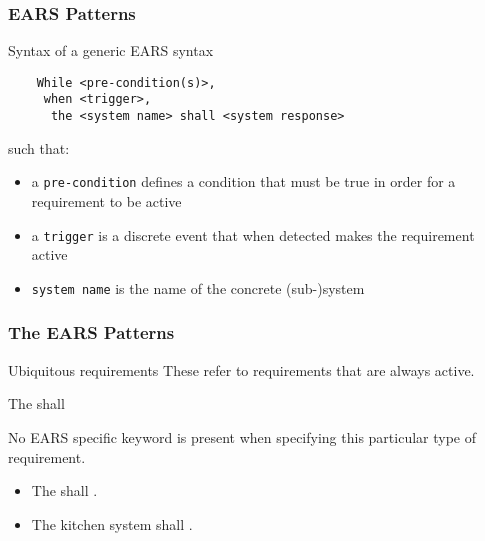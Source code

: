 \documentclass[aspectratio=169]{beamer}
\begin{document}
\begin{frame}[fragile]
  \frametitle{EARS Patterns}
  \begin{block}{Syntax of a generic EARS syntax}
    \begin{verbatim}
    While <pre-condition(s)>, 
     when <trigger>, 
      the <system name> shall <system response>  
    \end{verbatim}
    such that:
    \begin{itemize}
      \item a {\tt pre-condition} defines a condition that must be true in order for a requirement to be active
      \item a {\tt trigger} is a discrete event that when detected makes the requirement active
      \item {\tt system name} is the name of the concrete (sub{-})system 
    \end{itemize}
  \end{block}

\end{frame}

\begin{frame}[fragile]
  \frametitle{The EARS Patterns}
  \begin{block}{Ubiquitous requirements}
    These refer to requirements that are always active. 
    \begin{center}
    The {\color{red}{$<$system name$>$}} shall {\color{blue}{$<$system response$>$}}
    \end{center}
    No EARS specific keyword is present when specifying this particular type of requirement.
  \end{block}
  \begin{example}
    \begin{itemize}
      \item The {\color{red}{mobile phone}} shall {\color{blue}{have a mass of less than $x$ grams}}.
      \item The {\color{red}kitchen system} shall {\color{blue}{have an input hatch}}.
    \end{itemize}
  \end{example}
\end{frame}
\end{document}
